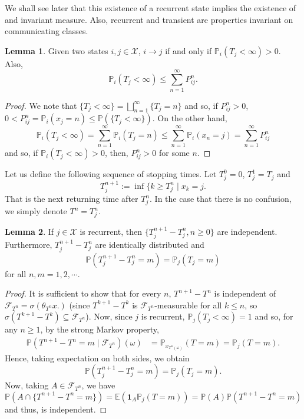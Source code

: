 \documentclass[]{article}
\theoremstyle{definition}
\theoremstyle{definition}
\newtheorem{lemma}{Lemma}[section]
\begin{document}
We shall see later that this existence of a recurrent state implies the existence of 
and invariant measure. Also, recurrent and transient are properties invariant 
on communicating classes.

\begin{lemma}
  Given two states \(i, j \in \mathcal{X}\), \(i \longrightarrow j\) if and only 
  if \(\mathbb{P}_i(T_j < \infty) > 0\). Also, 
  \[\mathbb{P}_i(T_j < \infty) \le \sum_{n = 1}^\infty P_{ij}^n.\]
\end{lemma}
\begin{proof}
  We note that \(\{T_j < \infty\} = \bigsqcup_{n = 1}^\infty \{T_j = n\}\) and so, 
  if \(P^n_{ij} > 0\), \(0 < P^n_{ij} = \mathbb{P}_i(x_j = n) \le \mathbb{P}(\{T_j < \infty\})\).
  On the other hand, 
  \[\mathbb{P}_i(T_j < \infty) = \sum_{n = 1}^\infty \mathbb{P}_i(T_j = n) \le 
    \sum_{n = 1}^\infty \mathbb{P}_i(x_n = j) = \sum_{n = 1}^\infty P^n_{ij}\] 
  and so, if \(\mathbb{P}_i(T_j < \infty) > 0\), then, \(P_{ij}^n > 0\) for some \(n\).
\end{proof}

Let us define the following sequence of stopping times. Let \(T_j^0 = 0\), 
\(T_j^1 = T_j\) and 
\[T_j^{n + 1} := \inf \{k \ge T_j^n \mid x_k = j.\]
That is the next returning time after \(T_j^n\). In the case that there is no confusion, 
we simply denote \(T^n = T^n_j\).

\begin{lemma}
  If \(j \in \mathcal{X}\) is recurrent, then \(\{T_j^{n + 1} - T_j^n, n \ge 0\}\) 
  are independent. Furthermore, \(T_j^{n + 1} - T_j^n\) are identically distributed 
  and 
  \[\mathbb{P}(T_j^{n + 1} - T_j^n = m) = \mathbb{P}_j(T_j = m)\]
  for all \(n, m = 1, 2, \cdots\).
\end{lemma}
\begin{proof}
  It is sufficient to show that for every \(n\), \(T^{n + 1} - T^n\) is independent 
  of \(\mathcal{F}_{T^n} = \sigma(\theta_{T^n} x.)\) (since \(T^{k + 1} - T^k\) 
  is \(\mathcal{F}_{T^n}\)-measurable for all \(k \le n\), so \(\sigma(T^{k + 1} - T^k) 
  \subseteq \mathcal{F}_{T^n}\)). Now, since \(j\) is recurrent, 
  \(\mathbb{P}_j(T_j < \infty) = 1\) and so, for any \(n \ge 1\), by the strong 
  Markov property,
  \[\begin{split}
    \mathbb{P}(T^{n + 1} - T^n = m \mid \mathcal{F}_{T^n})(\omega) & = 
    \mathbb{P}_{x_{T^n(\omega)}}(T = m) = \mathbb{P}_j(T = m).
  \end{split}\]
  Hence, taking expectation on both sides, we obtain
  \[\mathbb{P}(T_j^{n + 1} - T_j^n = m) = \mathbb{P}_j(T_j = m).\]
  Now, taking \(A \in \mathcal{F}_{T^n}\), we have 
  \[\mathbb{P}(A \cap \{T^{n + 1} - T^n = m\}) = \mathbb{E}(\mathbf{1}_A \mathbb{P}_j(T = m))
    = \mathbb{P}(A) \mathbb{P}(T^{n + 1} - T^n = m)\]
  and thus, is independent.
\end{proof}
\end{document}
